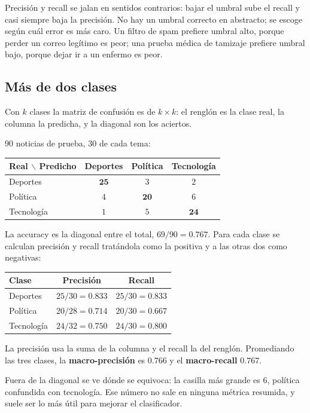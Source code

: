 \documentclass[11pt,letterpaper]{article}
\begin{document}
\begin{idea}
    Precisión y recall se jalan en sentidos contrarios: bajar el
    umbral sube el recall y casi siempre baja la precisión. No hay un
    umbral correcto en abstracto; se escoge según cuál error es más
    caro. Un filtro de spam prefiere umbral alto, porque perder un
    correo legítimo es peor; una prueba médica de tamizaje prefiere
    umbral bajo, porque dejar ir a un enfermo es peor.
\end{idea}


\subsection*{Más de dos clases}

Con $k$ clases la matriz de confusión es de $k \times k$: el renglón
es la clase real, la columna la predicha, y la diagonal son los
aciertos.

\begin{ejemplo}
    $90$ noticias de prueba, $30$ de cada tema:
    \begin{center}
    \begin{tabular}{lccc}
        \toprule
        \textbf{Real} $\backslash$ \textbf{Predicho} & Deportes
            & Política & Tecnología \\
        \midrule
        Deportes   & $\mathbf{25}$ & $3$ & $2$ \\
        Política   & $4$ & $\mathbf{20}$ & $6$ \\
        Tecnología & $1$ & $5$ & $\mathbf{24}$ \\
        \bottomrule
    \end{tabular}
    \end{center}
    La accuracy es la diagonal entre el total, $69 / 90 = 0.767$. Para
    cada clase se calculan precisión y recall tratándola como la
    positiva y a las otras dos como negativas:
    \begin{center}
    \begin{tabular}{lcc}
        \toprule
        \textbf{Clase} & \textbf{Precisión} & \textbf{Recall} \\
        \midrule
        Deportes   & $25/30 = 0.833$ & $25/30 = 0.833$ \\
        Política   & $20/28 = 0.714$ & $20/30 = 0.667$ \\
        Tecnología & $24/32 = 0.750$ & $24/30 = 0.800$ \\
        \bottomrule
    \end{tabular}
    \end{center}
    La precisión usa la suma de la columna y el recall la del renglón.
    Promediando las tres clases, la \textbf{macro-precisión} es
    $0.766$ y el \textbf{macro-recall} $0.767$.

    Fuera de la diagonal se ve dónde se equivoca: la casilla más
    grande es $6$, política confundida con tecnología. Ese número no
    sale en ninguna métrica resumida, y suele ser lo más útil para
    mejorar el clasificador.
\end{ejemplo}
\end{document}

